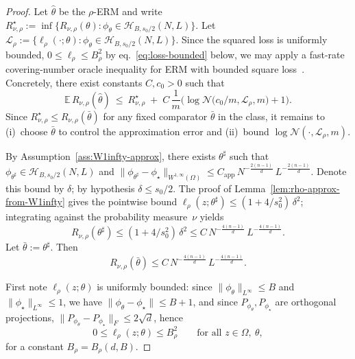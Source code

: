 \documentclass[11pt]{article}
\newcommand{\E}{\mathbb{E}}
\newcommand{\cH}{\mathcal{H}}
\newcommand{\cN}{\mathcal{N}}
\newcommand{\Om}{\Omega}
\newcommand{\norm}[1]{\lVert#1\rVert}
\begin{document}
\begin{proof}
Let $\hat\theta$ be the $\rho$-ERM and write
  $R_{\nu,\rho}^\star
  :=\inf\{R_{\nu,\rho}(\theta):\phi_\theta\in\cH_{B,s_0/2}(N,L)\}$.
Let
  $\mathcal L_\rho:=\{\ell_\rho(\cdot;\theta):\phi_\theta\in\cH_{B,s_0/2}(N,L)\}$.
Since the squared loss is uniformly bounded,
$0\le \ell_\rho\le B_\rho^2$ by
eq.~\eqref{eq:loss-bounded} below, we may apply a fast-rate covering-number
oracle inequality for ERM with bounded square
loss~\cite[Theorem~11.3]{Gyrfi2002ADT,bartlett2005local}.
Concretely, there exist
constants $C,c_0>0$ such that
\begin{equation}\label{eq:oracle-erm}
  \E\,R_{\nu,\rho}(\hat\theta)
  \ \le\
  R_{\nu,\rho}^\star
  \;+\;
  C\,\frac{1}{m}\Big(\log \cN\big(c_0/m,\mathcal L_\rho,m\big)+1\Big).
\end{equation}
Since $R_{\nu,\rho}^\star\le R_{\nu,\rho}(\bar\theta)$ for any fixed
comparator $\bar\theta$ in the class, it remains to (i)~choose
$\bar\theta$ to control the approximation error and (ii)~bound
$\log\cN(\cdot,\mathcal L_\rho,m)$.


By Assumption~\ref{ass:W1infty-approx}, there exists $\theta^\sharp$ such that
$\phi_{\theta^\sharp}\in\cH_{B,s_0/2}(N,L)$ and
$\norm{\phi_{\theta^\sharp}-\phi_\star}_{W^{1,\infty}(\Om)}
  \le
  C_{\mathrm{app}}\,N^{-\frac{2(n-1)}{d}}\,L^{-\frac{2(n-1)}{d}}$.
Denote this bound by $\delta$; by hypothesis $\delta\le s_0/2$.
The proof of Lemma~\ref{lem:rho-approx-from-W1infty} gives the
pointwise bound $\ell_\rho(z;\theta^\sharp)\le(1+4/s_0^2)\,\delta^2$;
integrating against the probability measure~$\nu$ yields
\[
  R_{\nu,\rho}(\theta^\sharp)
  \le
  (1+4/s_0^2)\,\delta^2
  \le
  C\,N^{-\frac{4(n-1)}{d}}\,L^{-\frac{4(n-1)}{d}}.
\]
Let $\bar\theta:=\theta^\sharp$.  Then
\begin{equation}\label{eq:approx-term}
  R_{\nu,\rho}(\bar\theta)
  \le C\,N^{-\frac{4(n-1)}{d}}\,L^{-\frac{4(n-1)}{d}}.
\end{equation}


First note $\ell_\rho(z;\theta)$ is uniformly bounded: since
$\norm{\phi_\theta}_{L^\infty}\le B$ and
$\norm{\phi_\star}_{L^\infty}\le 1$, we have
$\norm{\phi_\theta-\phi_\star}\le B{+}1$, and since
$P_{\phi_\theta},P_{\phi_\star}$ are orthogonal projections,
$\norm{P_{\phi_\theta}-P_{\phi_\star}}_F\le 2\sqrt{d}$, hence
\begin{equation}\label{eq:loss-bounded}
  0\le \ell_\rho(z;\theta)\le B_\rho^2
  \qquad\text{for all }z\in \Om,\ \theta,
\end{equation}
for a constant $B_\rho=B_\rho(d,B)$.


\end{proof}
\end{document}
